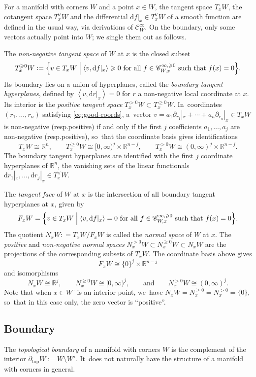 \documentclass[10pt]{amsart}
\newcommand{\Bset}[2]{\Bigl\{#1\Bigm|#2\Bigr\}}
\theoremstyle{definition}
\theoremstyle{remark}
\let\defn\emph
\newcommand{\RR}{\mathbb{R}}
\newcommand{\halfspc}[1]{[0,\infty)^{#1}}
\renewcommand{\ge}{\geqslant}
\newcommand{\defas}{\mathrel{\mathop:}=}
\newcommand{\abrac}[1]{\left\langle#1\right\rangle}
\newcommand{\Cinf}[1]{\mathscr{C}^{\infty}_{#1}}
\newcommand{\Cinfge}[1]{\mathscr{C}^{\infty, \ge 0}_{#1}}
\newcommand{\dd}{\mathrm{d}}
\newcommand{\cvf}[1]{\partial_{#1}}
\newcommand{\tb}[2][]{T_{#1}#2}
\newcommand{\tbpos}[2][]{T^{>0}_{#1}#2}
\newcommand{\tbge}[2][]{T^{\ge0}_{#1}#2}
\newcommand{\ctb}[2][]{T^\vee_{#1}#2}
\providecommand{\resp}{resp.}\providecommand{\cf}{cf.}\providecommand{\etc}{etc.}
\begin{document}
For a manifold with corners $W$ and a point $x\in W$, the tangent space $\tb[x]{W}$, the cotangent space $\ctb[x]{W}$ and the differential $\dd f|_x \in \ctb[x]{W}$ of a smooth function are defined in the usual way, via derivations of $\Cinf{W}$. On the boundary, only some vectors actually point into $W$; we single them out as follows.

The \defn{non-negative tangent space} of $W$ at $x$ is the closed subset
\[
\tbge[x]{W} \defas \Bset{v \in \tb[x]{W}}{\abrac{v,\dd f|_x} \ge 0 \textrm{ for all } f \in \Cinfge{W,x} \textrm{ such that $f(x)=0$}}.
\]
Its boundary lies on a union of hyperplanes, called the \defn{boundary tangent hyperplanes}, defined by $\abrac{v,\dd r|_x}=0$ for $r$ a non-negative local coordinate at $x$. Its interior is the \defn{positive tangent space} $\tbpos[x]{W} \subset \tbge[x]{W}$. In~coordinates $(r_1,\ldots,r_n)$ satisfying \eqref{eq:good-coords}, a~vector $v =a_1\cvf{r_1}|_x+\cdots +a_n\cvf{r_n}|_x \in \tb[x]{W}$ is non-negative (\resp positive) if and only if the first $j$ coefficients $a_1,\ldots,a_j$ are non-negative (\resp positive), so~that the coordinate basis gives identifications
\[
T_xW\cong \RR^n, \qquad T_x^{\ge 0}W \cong \halfspc{j}\times \RR^{n-j}, \qquad T_x^{>0}W\cong (0,\infty)^j\times \RR^{n-j}.
\]
The boundary tangent hyperplanes are identified with the first $j$ coordinate hyperplanes of $\RR^n$, \ie the vanishing sets of the linear functionals $\dd r_1|_x,\ldots,\dd r_j|_x\in \ctb[x]{W}$.

The \defn{tangent face} of $W$ at $x$ is the intersection of all boundary tangent hyperplanes at $x$, given by
\[
F_x W = \Bset{v \in \tb[x]{W}}{\abrac{v,\dd f|_x} = 0\textrm{ for all } f\in \Cinfge{W,x}\textrm{ such that }f(x)=0}.
\]
The quotient $N_x W\defas T_x W/F_x W$ is called the \defn{normal space} of $W$ at $x$. The \defn{positive} and \defn{non-negative normal spaces} $N_x^{>0}W\subset N_x^{\ge 0}W\subset N_xW$ are the projections of the corresponding subsets of $\tb[x]{W}$. The coordinate basis above gives
\[
F_x W\cong \{0\}^j\times \RR^{n-j}
\] and isomorphisms
\[
N_x W\cong \RR^j, \qquad N_x^{\ge 0} W \cong \halfspc{j}, \qquad \textrm{and} \qquad N_x^{>0} W \cong (0,\infty)^j.
\]
Note that when $x \in W^\circ$ is an interior point, we~have $N_xW=N_x^{\ge0}=N_x^{>0} = \{0\}$, so~that in this case only, the zero vector is ``positive''.

\subsection{Boundary}\label{sec:boundary-manifolds-with-corners}
The \defn{topological boundary} of a manifold with corners $W$ is the complement of the interior $\partial_{\mathrm{top}} W := W \setminus W^\circ$. It~does not naturally have the structure of a manifold with corners in general.
\end{document}
